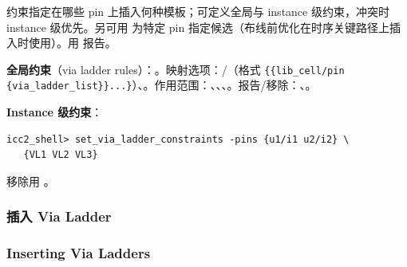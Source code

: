 约束指定在哪些 pin 上插入何种模板；可定义全局与 instance 级约束，冲突时 instance 级优先。另可用  为特定 pin 指定候选（布线前优化在时序关键路径上插入时使用）。用  报告。

\textbf{全局约束}（via ladder rules）：。映射选项：/（格式 \texttt{\{\{lib\_cell/pin \{via\_ladder\_list\}\}...\}}）、。作用范围：、、、。报告/移除：、。

\textbf{Instance 级约束}：
\begin{lstlisting}
icc2_shell> set_via_ladder_constraints -pins {u1/i1 u2/i2} \
   {VL1 VL2 VL3}
\end{lstlisting}
移除用 。

\subsubsection{插入 Via Ladder}
\subsubsection*{Inserting Via Ladders}

